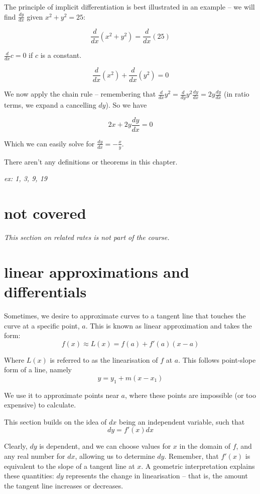 \documentclass[10pt,a4paper]{report}
\begin{document}
The principle of implicit differentiation is best illustrated in an example -- we will find $\frac{dy}{dx}$ given $x^2 + y^2 = 25$:

$$
	\frac{d}{dx}(x^2 + y^2) = \frac{d}{dx}(25)
$$

$\frac{d}{dx} c = 0$ if $c$ is a constant.

$$
	\frac{d}{dx}(x^2) + \frac{d}{dx}(y^2) = 0
$$

We now apply the chain rule -- remembering that $\frac{d}{dx} y^2 = \frac{d}{dy} y^2 \frac{dy}{dx} = 2y \frac{dy}{dx}$ (in ratio terms, we expand a cancelling $dy$). So we have

$$
	2x + 2y \frac{dy}{dx} = 0
$$

Which we can easily solve for $\frac{dy}{dx} = -\frac{x}{y}$.

There aren't any definitions or theorems in this chapter.

\emph{ex: 1, 3, 9, 19}


\section{not covered}

\emph{This section on related rates is not part of the course.}


\section{linear approximations and differentials}

Sometimes, we desire to approximate curves to a tangent line that touches the curve at a specific point, $a$. This is known as linear approximation and takes the form:
$$
	f(x) \approx L(x) = f(a) + f'(a)(x - a)
$$

Where $L(x)$ is referred to as the linearisation of $f$ at $a$. This follows point-slope form of a line, namely
$$
	y = y_1 + m(x - x_1)
$$

We use it to approximate points near $a$, where these points are impossible (or too expensive) to calculate.

This section builds on the idea of $dx$ being an independent variable, such that
$$
	dy = f'(x) dx
$$

Clearly, $dy$ is dependent, and we can choose values for $x$ in the domain of $f$, and any real number for $dx$, allowing us to determine $dy$. Remember, that $f'(x)$ is equivalent to the slope of a tangent line at $x$. A geometric interpretation explains these quantities: $dy$ represents the change in linearisation -- that is, the amount the tangent line increases or decreases.
\end{document}
